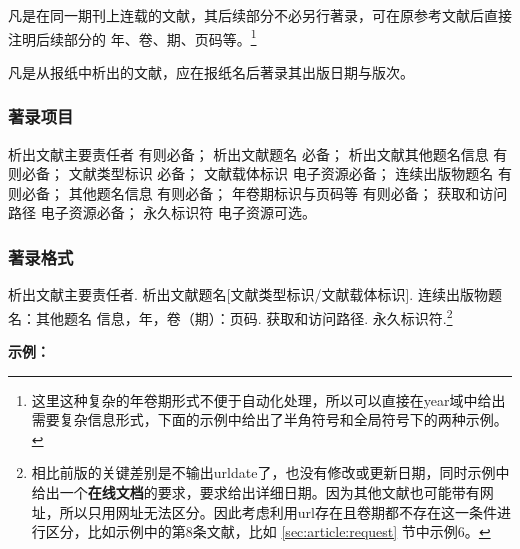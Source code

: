 \documentclass[twoside]{article}%
\begin{document}
凡是在同一期刊上连载的文献，其后续部分不必另行著录，可在原参考文献后直接注明后续部分的
年、卷、期、页码等。\footnote{这里这种复杂的年卷期形式不便于自动化处理，所以可以直接在year域中给出需要复杂信息形式，下面的示例中给出了半角符号和全局符号下的两种示例。}

\begin{refsection}

\nocite{egdatevolnumpagef--,egdatevolnumpagefull--}

{}
\end{refsection}


凡是从报纸中析出的文献，应在报纸名后著录其出版日期与版次。


\begin{refsection}

\nocite{egdatevolnumpageg--}

{}
\end{refsection}


\subsubsection{著录项目}

析出文献主要责任者 有则必备；
析出文献题名 必备；
析出文献其他题名信息 有则必备；
文献类型标识 必备；
文献载体标识 电子资源必备；
连续出版物题名 有则必备；
其他题名信息 有则必备；
年卷期标识与页码等 有则必备；
获取和访问路径 电子资源必备；
永久标识符 电子资源可选。

\subsubsection{著录格式}

析出文献主要责任者. 析出文献题名[文献类型标识/文献载体标识]. 连续出版物题名：其他题名
信息，年，卷（期）：页码. 获取和访问路径. 永久标识符.\footnote{相比前版的关键差别是不输出urldate了，也没有修改或更新日期，同时示例中给出一个\textbf{在线文档}的要求，要求给出详细日期。因为其他文献也可能带有网址，所以只用网址无法区分。因此考虑利用url存在且卷期都不存在这一条件进行区分，比如示例中的第8条文献，比如 \ref{sec:article:request} 节中示例6。}

\begin{refsection}



\nocite{杨洪升2013-56-75}
\nocite{丁文祥2000--}
\nocite{于潇2012-1518-1523}
\nocite{李炳穆2008-6-12}
\nocite{陈建军2010-93-93,陈缮真2022--,李幼平2010-225-228}
\nocite{张群2024在线,
张群2024出版,
Caplan1993-61-66,
Saito2006-169-176,
DESMARAIS1992-605-609,
Park2010-696-715,
Frese2013-378-398,
Myburg2014-356-362,SANTER2025ANN,SHINOTSUKA2023SAMPLE}



\textbf{示例：}

{\printbibliography[heading=none,env=indentegenv]}
\end{refsection}
\end{document}
